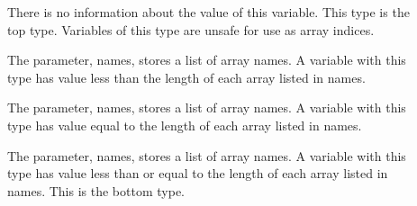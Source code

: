 \begin{description}
\item[]
  There is no information about the value of this variable.
  This type is the top type. Variables of this type are
  unsafe for use as array indices.
\item[]
  The parameter, names, stores a list of array names. A variable with this type
  has value less than the length of each array listed in names.
\item[]
  The parameter, names, stores a list of array names. A variable with this type
  has value equal to the length of each array listed in names.
\item[]
  The parameter, names, stores a list of array names. A variable with this type
  has value less than or equal to the length of each array listed in names.
  This is the bottom type.
\end{description}

